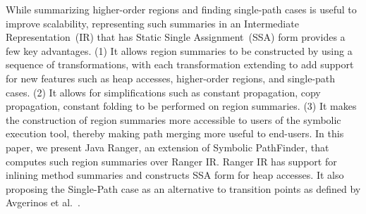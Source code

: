 While summarizing higher-order regions and finding single-path cases is useful to improve scalability,
representing such summaries in an Intermediate Representation~(IR) that has Static Single Assignment~(SSA) form
provides a few key advantages.
%
(1) It allows region summaries to be constructed by using a sequence of transformations, with each transformation
extending to add support for new features such as heap accesses, higher-order regions, and single-path cases.
%
(2) It allows for simplifications such as constant propagation, copy propagation, constant folding to be performed on
region summaries.
%
(3) It makes the construction of region summaries more accessible to users of the symbolic execution tool, thereby making
path merging more useful to end-users.
%
In this paper, we present Java Ranger, an extension of Symbolic PathFinder, that computes such region summaries over
Ranger IR.
%
Ranger IR has support for inlining method summaries and constructs SSA form for heap accesses.
%
It also proposing the Single-Path case as an alternative to transition points as
defined by Avgerinos et al.~\cite{veritesting}.
%
